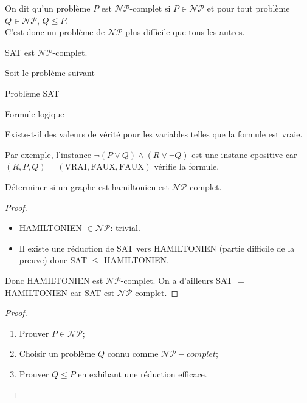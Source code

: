 \begin{mydef}
  On dit qu'un problème $P$ est $\mathcal{NP}$-complet si $P \in \mathcal{NP}$ et pour tout problème $Q \in \mathcal{NP}$, $Q \leq P$.\\
  C'est donc un problème de $\mathcal{NP}$ plus difficile que tous les autres.
\end{mydef}

\begin{mytheo} [Cook]
  SAT est $\mathcal{NP}$-complet.
\end{mytheo}

\begin{myexem}
  Soit le problème suivant
  \begin{description}
    \item{Problème} SAT
    \item[Instance] Formule logique
    \item[Question] Existe-t-il des valeurs de vérité pour les variables telles que la formule est vraie.
  \end{description}
  Par exemple, l'instance $\lnot(P \lor Q) \land (R \lor \lnot Q)$ est une instanc epositive car
  $(R, P, Q) = (\text{VRAI}, \text{FAUX}, \text{FAUX})$ vérifie la formule.
\end{myexem}

\begin{mytheo} [Karp]
  Déterminer si un graphe est hamiltonien est $\mathcal{NP}$-complet.
  \begin{proof}
    \begin{itemize}
      \item HAMILTONIEN $\in \mathcal{NP}$: trivial.
      \item Il existe une réduction de SAT vers HAMILTONIEN (partie difficile de la preuve) donc
        SAT $\leq$ HAMILTONIEN.
    \end{itemize}
    Donc HAMILTONIEN est $\mathcal{NP}$-complet.
    On a d'ailleurs SAT $=$ HAMILTONIEN car SAT est $\mathcal{NP}$-complet.
  \end{proof}
\end{mytheo}

\begin{mytheo} 
\begin{proof}
  \begin{enumerate}
    \item Prouver $P \in \mathcal{NP}$;
    \item Choisir un problème $Q$ connu comme $\mathcal{NP}-complet$;
    \item Prouver $Q \leq P$ en exhibant une réduction efficace.
  \end{enumerate}
  
  \end{proof}
\end{mytheo}

